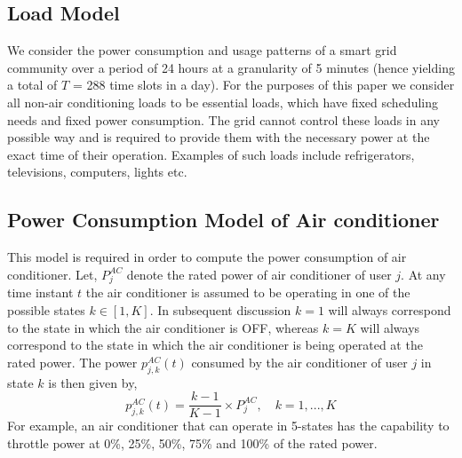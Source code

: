 \documentclass[10pt,twocolumn,twoside]{IEEEtran}
\begin{document}
\subsection{Load Model}
We consider the power consumption and usage patterns of a smart grid community over a period of 24 hours at a granularity of 5 minutes (hence yielding a total of $T$ = 288 time slots in a day). For the purposes of this paper we consider all non-air conditioning loads to be essential loads, which have fixed scheduling needs and fixed power consumption. The grid cannot control these loads in any possible way and is required to provide them with the necessary power at the exact time of their operation. Examples of such loads include refrigerators, televisions, computers, lights etc. 

\subsection{Power Consumption Model of Air conditioner}
This model is required in order to compute the power consumption of air conditioner. Let, $P^{AC}_{j}$ denote the rated power of air conditioner of user $j$. At any time instant $t$ the air conditioner is assumed to be operating in one of the possible states $k\in[1,K]$. In subsequent discussion $k=1$ will always correspond to the state in which the air conditioner is OFF, whereas $k=K$ will always correspond to the state in which the air conditioner is being operated at the rated power. The power $p^{AC}_{j,k}(t)$ consumed by the air conditioner of user $j$ in state $k$ is then given by,
\begin{equation}
p^{AC}_{j,k}(t)=\frac{k-1}{K-1}\times P^{AC}_j, \quad k = 1,...,K                
\label{power_levels}
\end{equation}
For example, an air conditioner that can operate in 5-states has the capability to throttle power at 0\%, 25\%, 50\%, 75\% and 100\% of the rated power. 
\end{document}

